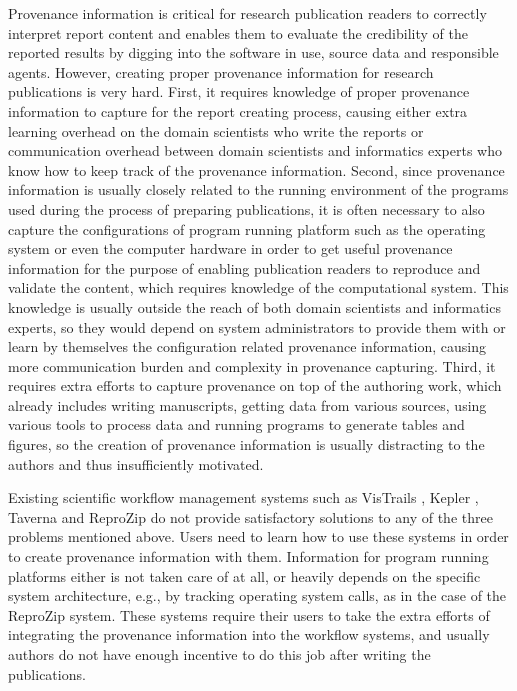  
 
Provenance information is critical for research publication readers to correctly interpret report content and enables them to evaluate the credibility of the reported results by digging into the software in use, source data and responsible agents. However, creating proper provenance information for research publications is very hard. First, it requires knowledge of proper provenance information to capture for the report creating process, causing either extra learning overhead on the domain scientists who write the reports or communication overhead between domain scientists and informatics experts who know how to keep track of the provenance information. Second, since provenance information is usually closely related to the running environment of the programs used during the process of preparing publications, it is often necessary to also capture the configurations of program running platform such as the operating system or even the computer hardware in order to get useful provenance information for the purpose of enabling publication readers to reproduce and validate the content, which requires knowledge of the computational system. This knowledge is usually outside the reach of both domain scientists and informatics experts, so they would depend on system administrators to provide them with or learn by themselves the configuration related provenance information, causing more communication burden and complexity in provenance capturing. Third, it requires extra efforts to capture provenance on top of the authoring work, which already includes writing manuscripts, getting data from various sources, using various tools to process data and running programs to generate tables and figures, so the creation of provenance information is usually distracting to the authors and thus insufficiently motivated. 

Existing scientific workflow management systems such as VisTrails \cite{freire2014reproducibility}, Kepler \cite{ludascher2006scientific}, Taverna \cite{wolstencroft2013taverna} and ReproZip \cite{chirigati2013reprozip} do not provide satisfactory solutions to any of the three problems mentioned above. Users need to learn how to use these systems in order to create provenance information with them. Information for program running platforms either is not taken care of at all, or heavily depends on the specific system architecture, e.g., by tracking operating system calls, as in the case of the ReproZip system. These systems require their users to take the extra efforts of integrating the provenance information into the workflow systems, and usually authors do not have enough incentive to do this job after writing the publications.

